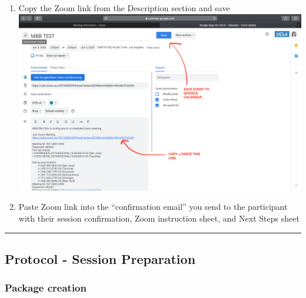 \documentclass[]{book}
\begin{document}
\begin{enumerate}
\item
  Copy the Zoom link from the Description section and save \includegraphics{images/zoom_link/7.png}
\item
  Paste Zoom link into the ``confirmation email'' you send to the participant with their session confirmation, Zoom instruction sheet, and Next Steps sheet
\end{enumerate}

\begin{center}\rule{0.5\linewidth}{0.5pt}\end{center}

\hypertarget{protocol---session-preparation}{%
\subsection{Protocol - Session Preparation}\label{protocol---session-preparation}}

\hypertarget{package-creation}{%
\subsubsection{Package creation}\label{package-creation}}
\end{document}
